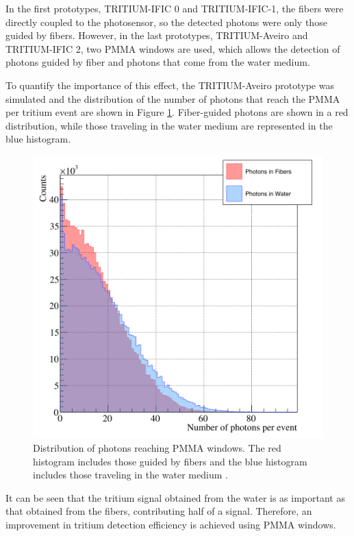 In the first prototypes, TRITIUM-IFIC 0 and TRITIUM-IFIC-1, the fibers were directly coupled to the photosensor, so the detected photons were only those guided by fibers. However, in the last prototypes, TRITIUM-Aveiro and TRITIUM-IFIC 2, two PMMA windows are used, which allows the detection of photons guided by fiber and photons that come from the water medium.

To quantify the importance of this effect, the TRITIUM-Aveiro prototype was simulated and the distribution of the number of photons that reach the PMMA per tritium event are shown in Figure \ref{fig:PMMAEffect}. Fiber-guided photons are shown in a red distribution, while those traveling in the water medium are represented in the blue histogram.

\begin{figure}[hbtp]
\centering
\includegraphics[scale=0.3]{Figures/8SimulationsResults/81TRITIUMDesign/815PMMA/PhotonsDetectedWaterFiber.png}
\caption{Distribution of photons reaching PMMA windows. The red histogram includes those guided by fibers and the blue histogram includes those traveling in the water medium \cite{SimulationPaperCarlos}.\label{fig:PMMAEffect}}
\end{figure}

It can be seen that the tritium signal obtained from the water is as important as that obtained from the fibers, contributing half of a signal. Therefore, an improvement in tritium detection efficiency is achieved using PMMA windows.